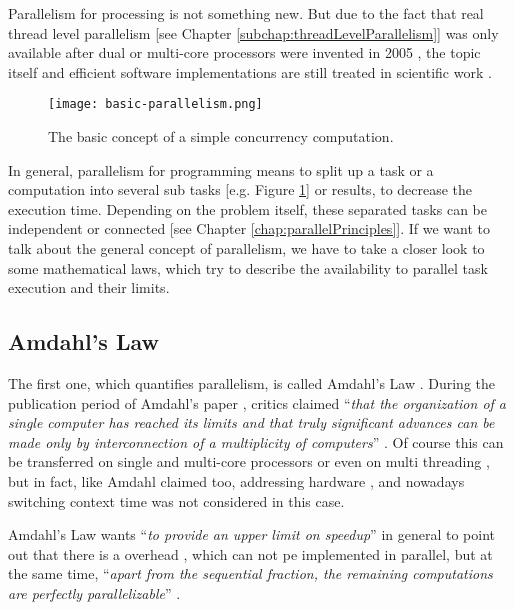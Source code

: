 Parallelism for processing is not something new. But due to the fact that real thread level parallelism [see Chapter \ref{subchap:threadLevelParallelism}] was only available after dual or multi-core processors were invented in 2005 \parencite{internet6}, the topic itself and efficient software implementations are still treated in scientific work \parencite{book3} \parencite{article2}.

\begin{figure}[h!]
	\centering
	\texttt{[image: basic-parallelism.png]}
	\caption{
		The basic concept of a simple concurrency computation.
	}
	\label{fig:basicPara}
\end{figure}

In general, parallelism for programming means to split up a task or a computation into several sub tasks [e.g. Figure \ref{fig:basicPara}] or results, to decrease the execution time. Depending on the problem itself, these separated tasks can be independent or connected [see Chapter \ref{chap:parallelPrinciples}]. If we want to talk about the general concept of parallelism, we have to take a closer look to some mathematical laws, which try to describe the availability to parallel task execution and their limits.

\subsection{Amdahl's Law}

The first one, which quantifies parallelism, is called Amdahl's Law \parencite{inbook1}. During the publication period of Amdahl's paper \parencite{book6}, critics claimed ``\textit{that the organization of a single computer has reached its limits and that
truly significant advances can be made only by interconnection of a multiplicity of computers}” \parencite[see][p80]{inbook1}. Of course this can be transferred on single and multi-core processors or even on multi threading \parencite[see][Chapter 1.3, p2]{phdthesis1}, but in fact, like Amdahl claimed too, addressing hardware \parencite{inbook1}, and nowadays switching context time was not considered in this case.

Amdahl's Law wants ``\textit{to provide an upper limit on speedup}'' \parencite[see][p81]{inbook1} in general to point out that there is a overhead \parencite{inbook1}, which can not pe implemented in parallel, but at the same time, ``\textit{apart from the sequential fraction, the remaining computations are perfectly parallelizable}'' \parencite[see][p81]{inbook1}.

